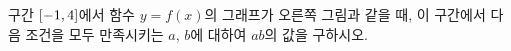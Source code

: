 \noindent\begin{minipage}[t]{0.58\linewidth}\vspace{0pt}\raggedright 구간 $[-1{,}\mkern3mu\mathopen{}4]$에서 함수 $y=f(x)$의 그래프가 오른쪽 그림과 같을 때, 이 구간에서 다음 조건을 모두 만족시키는 $a$, $b$에 대하여 $ab$의 값을 구하시오.\end{minipage}\hfill\begin{minipage}[t]{0.4\linewidth}\vspace{0pt}\centering \resizebox{\ifdim\width>\linewidth\linewidth\else\width\fi}{!}{}\end{minipage}\par
\noindent {}
